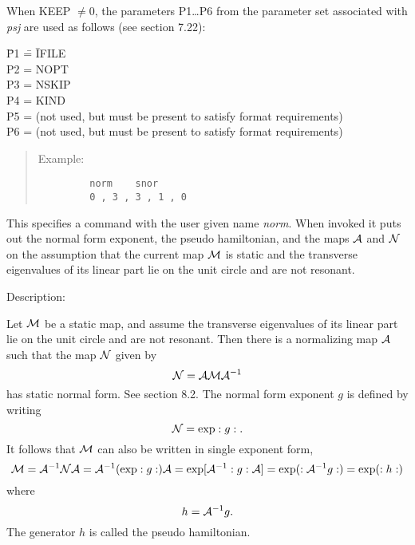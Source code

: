 When KEEP $\neq 0$, the parameters P1\ldots P6 from the parameter set associated
with {\em psj } are used as follows (see section 7.22):
\begin{tabbing}
\indent \=P1 \= = \= IFILE\\
        \>P2 \> = \> NOPT\\
        \>P3 \> = \> NSKIP\\
        \>P4 \> = \> KIND\\
        \>P5 \> =  (not used, but must be present to satisfy format requirements)\\
        \>P6 \> =  (not used, but must be present to satisfy format requirements)
\end{tabbing}

\vspace{5mm}
\begin{quotation}
\noindent Example:
\begin{verbatim}
         norm    snor
         0 , 3 , 3 , 1 , 0
\end{verbatim}
\end{quotation}
This specifies a command with the user given name {\em norm}.  When invoked it puts out the normal form exponent, the pseudo hamiltonian, and the maps ${\cal A}$ and ${\cal N}$ on the assumption that the current map ${\cal M}$ is static and the transverse eigenvalues of its linear part lie on the unit circle and are not resonant.

\vspace{5mm}
     Description:
\vspace{2mm}

Let ${\cal M}$ be a static map, and assume the transverse eigenvalues of its linear part lie on the unit circle and are not resonant.  Then there is a normalizing map ${\cal A}$ such that the map ${\cal N}$ given by
\[
{\cal N} = {\cal A} {\cal M} {\cal A}^{-1}
\]
has static normal form.  See section 8.2.  The normal form exponent $g$ is defined by writing
\[
{\cal N} = \exp :g:.
\]
It follows that ${\cal M}$ can also be written in single exponent form,
\[
{\cal M} = {\cal A}^{-1} {\cal N} {\cal A} = {\cal A}^{-1} (\exp :g:) {\cal A} = \exp [{\cal A}^{-1} :g:{\cal A}] = \exp (:{\cal A}^{-1} g:) = \exp (:h:)
\]
where
\[
h = {\cal A}^{-1} g.
\]
The generator $h$ is called the pseudo hamiltonian.

